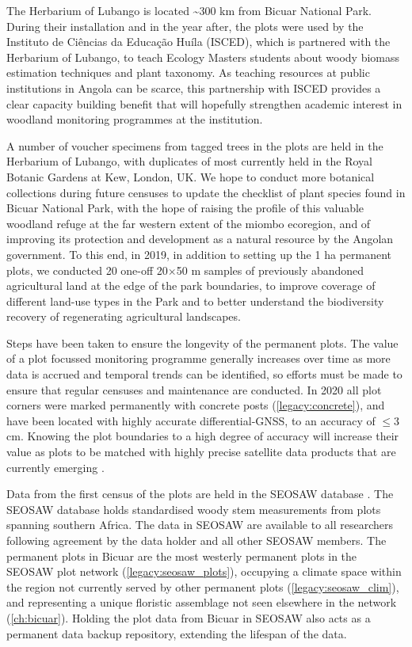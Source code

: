 \begin{refsection}
The Herbarium of Lubango is located \textasciitilde{}300 km from Bicuar National Park. During their installation and in the year after, the plots were used by the Instituto de Ci\^{e}ncias da Educa\c{c}\~{a}o Hu\'{i}la (ISCED), which is partnered with the Herbarium of Lubango, to teach Ecology Masters students about woody biomass estimation techniques and plant taxonomy. As teaching resources at public institutions in Angola can be scarce, this partnership with ISCED provides a clear capacity building benefit that will hopefully strengthen academic interest in woodland monitoring programmes at the institution.

A number of voucher specimens from tagged trees in the plots are held in the Herbarium of Lubango, with duplicates of most currently held in the Royal Botanic Gardens at Kew, London, UK. We hope to conduct more botanical collections during future censuses to update the checklist of plant species found in Bicuar National Park, with the hope of raising the profile of this valuable woodland refuge at the far western extent of the miombo ecoregion, and of improving its protection and development as a natural resource by the Angolan government. To this end, in 2019, in addition to setting up the 1 ha permanent plots, we conducted 20 one-off 20$\times$50 m samples of previously abandoned agricultural land at the edge of the park boundaries, to improve coverage of different land-use types in the Park and to better understand the biodiversity recovery of regenerating agricultural landscapes.

Steps have been taken to ensure the longevity of the permanent plots. The value of a plot focussed monitoring programme generally increases over time as more data is accrued and temporal trends can be identified, so efforts must be made to ensure that regular censuses and maintenance are conducted. In 2020 all plot corners were marked permanently with concrete posts (\autoref{legacy:concrete}), and have been located with highly accurate differential-GNSS, to an accuracy of $\le$3 cm. Knowing the plot boundaries to a high degree of accuracy will increase their value as plots to be matched with highly precise satellite data products that are currently emerging \citep{Exbrayat2019, GeorgeChacon2019, Wagner2018}. 

Data from the first census of the plots are held in the SEOSAW database \citep{SEOSAW2020}. The SEOSAW database holds standardised woody stem measurements from plots spanning southern Africa. The data in SEOSAW are available to all researchers following agreement by the data holder and all other SEOSAW members. The permanent plots in Bicuar are the most westerly permanent plots in the SEOSAW plot network (\autoref{legacy:seosaw_plots}), occupying a climate space within the region not currently served by other permanent plots (\autoref{legacy:seosaw_clim}), and representing a unique floristic assemblage not seen elsewhere in the network (\autoref{ch:bicuar}). Holding the plot data from Bicuar in SEOSAW also acts as a permanent data backup repository, extending the lifespan of the data.


\end{refsection}
